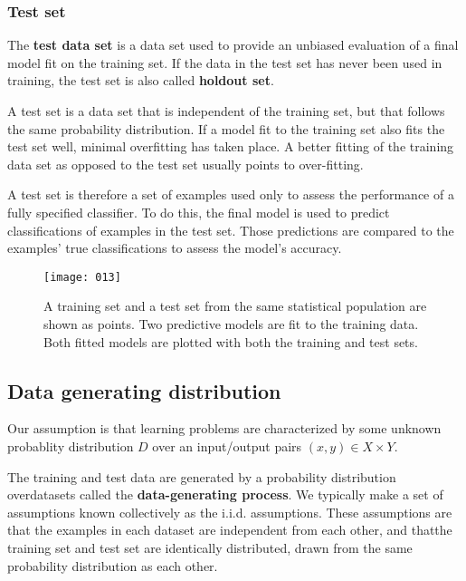 \subsubsection{Test set}
The \textbf{test data set} is a data set used to provide an unbiased evaluation of a final model fit on the training set. If the data in the test set has never been used in training, the test set is also called \textbf{holdout set}.

A test set is a data set that is independent of the training set, but that follows the same probability distribution. If a model fit to the training set also fits the test set well, minimal overfitting has taken place. A better fitting of the training data set as opposed to the test set usually points to over-fitting.

A test set is therefore a set of examples used only to assess the performance of a fully specified classifier. To do this, the final model is used to predict classifications of examples in the test set. Those predictions are compared to the examples' true classifications to assess the model's accuracy.

\begin{figure}[h]
\begin{center}
    \texttt{[image: 013]}
    \caption{}
\end{center}
\caption{A training set and a test set from the same statistical population are shown as points. Two predictive models are fit to the training data. Both fitted models are plotted with both the training and test sets.}
\end{figure}

\subsection{Data generating distribution}
Our assumption is that learning problems are characterized by some unknown probablity distribution \(D\) over an input/output pairs \((x,y) \in X \times Y\). 

The training and test data are generated by a probability distribution overdatasets called the \textbf{data-generating process}. We typically make a set of assumptions known collectively as the i.i.d. assumptions. These assumptions are that the examples in each dataset are independent from each other, and thatthe training set and test set are identically distributed, drawn from the same probability distribution as each other. 

